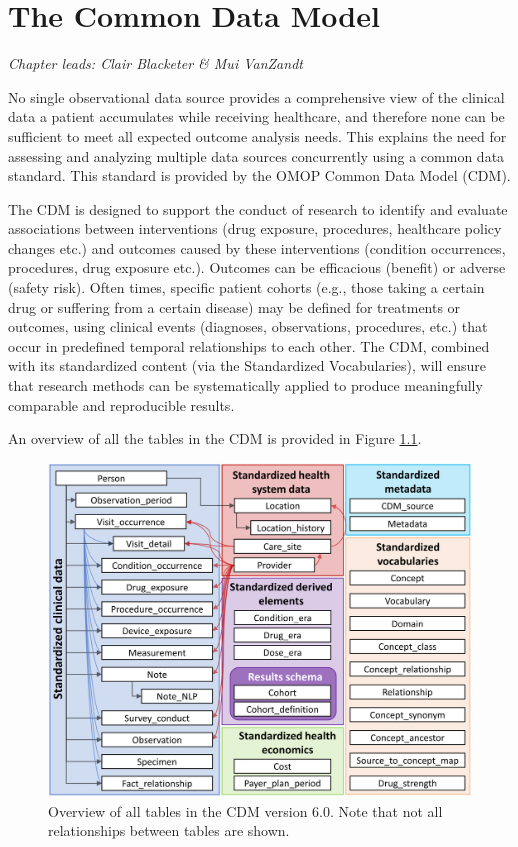 \documentclass[11pt]{book}
\begin{document}
\chapter{The Common Data Model}\label{CommonDataModel}

\emph{Chapter leads: Clair Blacketer \& Mui VanZandt}

No single observational data source provides a comprehensive view of the
clinical data a patient accumulates while receiving healthcare, and
therefore none can be sufficient to meet all expected outcome analysis
needs. This explains the need for assessing and analyzing multiple data
sources concurrently using a common data standard. This standard is
provided by the OMOP Common Data Model (CDM).

The CDM is designed to support the conduct of research to identify and
evaluate associations between interventions (drug exposure, procedures,
healthcare policy changes etc.) and outcomes caused by these
interventions (condition occurrences, procedures, drug exposure etc.).
Outcomes can be efficacious (benefit) or adverse (safety risk). Often
times, specific patient cohorts (e.g., those taking a certain drug or
suffering from a certain disease) may be defined for treatments or
outcomes, using clinical events (diagnoses, observations, procedures,
etc.) that occur in predefined temporal relationships to each other. The
CDM, combined with its standardized content (via the Standardized
Vocabularies), will ensure that research methods can be systematically
applied to produce meaningfully comparable and reproducible results.

An overview of all the tables in the CDM is provided in Figure
\ref{fig:cdmDiagram}.

\begin{figure}
\includegraphics[width=1\linewidth]{images/CommonDataModel/cdmDiagram} \caption{Overview of all tables in the CDM version 6.0. Note that not all relationships between tables are shown.}\label{fig:cdmDiagram}
\end{figure}
\end{document}
